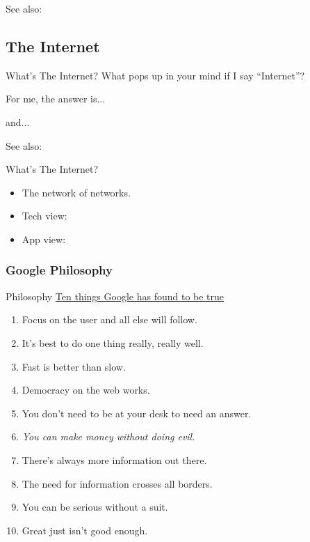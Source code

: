 See also: 

\subsection[Internet]{The Internet}

\begin{frame}{What's The Internet?}
  What pops up in your mind if I say ``Internet''?\pause
  
  \begin{iblock}{For me, the answer is...}
    \begin{center}
    \end{center}
      and...\pause
    \begin{center}
    \end{center}
  \end{iblock}
\end{frame}

See also: 

\begin{frame}{What's The Internet?}
  \begin{itemize}
  \item The network of networks.
  \item Tech view: \href{http://en.wikipedia.org/wiki/Tcp/ip}{{\tcpip}}
  \item App view: \href{http://en.wikipedia.org/wiki/Google}{\googlelogo}
  \end{itemize}
\end{frame}

\subsubsection[Why Google?]{Google Philosophy}

\begin{frame}{\googlelogo{} Philosophy}
  {\href{http://www.google.com/corporate/tenthings.html}{Ten things Google has found
      to be true}}

  \begin{enumerate}
  \item Focus on the user and all else will follow.
  \item It's best to do one thing really, really well.
  \item Fast is better than slow.
  \item Democracy on the web works.
  \item You don't need to be at your desk to need an answer.
  \item \emph{You can make money without doing evil.}
  \item There's always more information out there.
  \item The need for information crosses all borders.
  \item You can be serious without a suit.
  \item Great just isn't good enough.
  \end{enumerate}
\end{frame}

